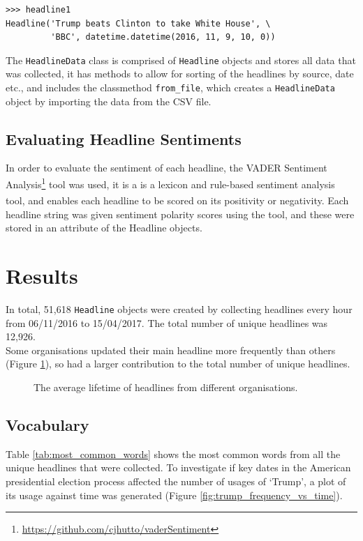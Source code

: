 \documentclass[a4paper,12pt]{article}
\begin{document}
\begin{verbatim}
>>> headline1
Headline('Trump beats Clinton to take White House', \
         'BBC', datetime.datetime(2016, 11, 9, 10, 0))
\end{verbatim}

The \texttt{HeadlineData} class is comprised of \texttt{Headline} objects and stores all data that was collected, it has methods to allow for sorting of the headlines by source, date etc., and includes the classmethod \texttt{from\_file}, which creates a \texttt{HeadlineData} object by importing the data from the CSV file.

\subsection{Evaluating Headline Sentiments}
In order to evaluate the sentiment of each headline, the VADER Sentiment Analysis\footnote{\url{https://github.com/cjhutto/vaderSentiment}} tool was used, it is a is a lexicon and rule-based sentiment analysis tool\textsuperscript{\cite{VADER}}, and enables each headline to be scored on its positivity or negativity. Each headline string was given sentiment polarity scores using the tool, and these were stored in an attribute of the Headline objects.

\section{Results}

In total, 51,618 \texttt{Headline} objects were created by collecting headlines every hour from 06/11/2016 to 15/04/2017. The total number of unique headlines was 12,926. \\
Some organisations updated their main headline more frequently than others (Figure \ref{fig:update_time_vs_organisation}), so had a larger contribution to the total number of unique headlines. 

\begin{figure}[H]
    \centering
    
    \caption{The average lifetime of headlines from different organisations.}
    \label{fig:update_time_vs_organisation}
\end{figure}

\subsection{Vocabulary}
Table \ref{tab:most_common_words} shows the most common words from all the unique headlines that were collected. To investigate if key dates in the American presidential election process affected the number of usages of `Trump', a plot of its usage against time was generated (Figure \ref{fig:trump_frequency_vs_time}).
\end{document}
